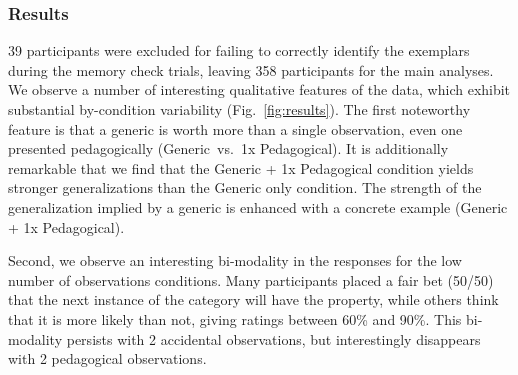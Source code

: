 \documentclass[10pt,letterpaper]{article}
\newcommand{\mht}[1]{\textcolor{Blue}{[mht: #1]}}
\begin{document}








\subsubsection{Results}



39 participants were excluded for failing to correctly identify the exemplars during the memory check trials, leaving 358 participants for the main analyses.
We observe a number of interesting qualitative features of the data, which exhibit substantial by-condition variability (Fig.~\ref{fig:results}). 
The first noteworthy feature is that a generic is worth more than a single observation, even one presented pedagogically (Generic~vs.~1x Pedagogical). 
It is additionally remarkable that we find that the Generic + 1x Pedagogical condition yields stronger generalizations than the Generic only condition. 
The strength of the generalization implied by a generic is enhanced with a concrete example (Generic + 1x Pedagogical). 

Second, we observe an interesting bi-modality in the responses for the low number of observations conditions. 
Many participants placed a fair bet (50/50) that the next instance of the category will have the property, while others think that it is more likely than not, giving ratings between 60\% and 90\%. 
This bi-modality persists with 2 accidental observations, but interestingly disappears with 2 pedagogical observations. 

\end{document}
